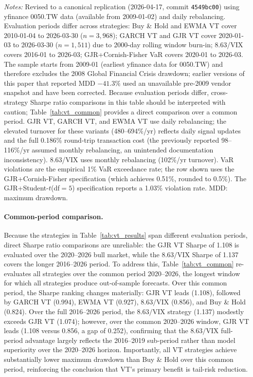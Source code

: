 \begin{table}[H]
\begin{flushleft}
\small \textit{Notes:} Revised to a canonical replication (2026-04-17, commit \texttt{4549bc00}) using yfinance 0050.TW data (available from 2009-01-02) and daily rebalancing. Evaluation periods differ across strategies: Buy \& Hold and EWMA VT cover 2010-01-04 to 2026-03-30 ($n = 3{,}968$); GARCH VT and GJR VT cover 2020-01-03 to 2026-03-30 ($n = 1{,}511$) due to 2000-day rolling window burn-in; 8.63/VIX covers 2016-01 to 2026-03; GJR+Cornish-Fisher VaR covers 2020-01 to 2026-03. The sample starts from 2009-01 (earliest yfinance data for 0050.TW) and therefore excludes the 2008 Global Financial Crisis drawdown; earlier versions of this paper that reported MDD $-41.3\%$ used an unavailable pre-2009 vendor snapshot and have been corrected. Because evaluation periods differ, cross-strategy Sharpe ratio comparisons in this table should be interpreted with caution; Table~\ref{tab:vt_common} provides a direct comparison over a common period. GJR VT, GARCH VT, and EWMA VT use daily rebalancing; the elevated turnover for these variants (480--694\%/yr) reflects daily signal updates and the full 0.186\% round-trip transaction cost (the previously reported 98--116\%/yr assumed monthly rebalancing, an unintended documentation inconsistency). 8.63/VIX uses monthly rebalancing (102\%/yr turnover). VaR violations are the empirical 1\% VaR exceedance rate; the row shown uses the GJR+Cornish-Fisher specification (which achieves 0.51\%, rounded to 0.5\%). The GJR+Student-$t$(df$= 5$) specification reports a 1.03\% violation rate. MDD: maximum drawdown.
\end{flushleft}
\end{table}

\paragraph{Common-period comparison.} Because the strategies in Table~\ref{tab:vt_results} span different evaluation periods, direct Sharpe ratio comparisons are unreliable: the GJR VT Sharpe of 1.108 is evaluated over the 2020--2026 bull market, while the $8.63/\text{VIX}$ Sharpe of 1.137 covers the longer 2016--2026 period. To address this, Table~\ref{tab:vt_common} re-evaluates all strategies over the common period 2020--2026, the longest window for which all strategies produce out-of-sample forecasts. Over this common period, the Sharpe ranking changes materially: GJR VT leads (1.108), followed by GARCH VT (0.994), EWMA VT (0.927), $8.63/\text{VIX}$ (0.856), and Buy \& Hold (0.824). Over the full 2016--2026 period, the $8.63/\text{VIX}$ strategy (1.137) modestly exceeds GJR VT (1.074); however, over the common 2020--2026 window, GJR VT leads (1.108 versus 0.856, a gap of 0.252), confirming that the $8.63/\text{VIX}$ full-period advantage largely reflects the 2016--2019 sub-period rather than model superiority over the 2020--2026 horizon. Importantly, all VT strategies achieve substantially lower maximum drawdown than Buy \& Hold over this common period, reinforcing the conclusion that VT's primary benefit is tail-risk reduction.

